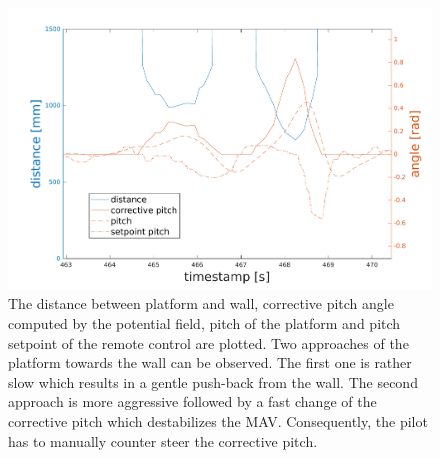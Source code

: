 \begin{figure}
	\centering
	\includegraphics[width=0.9\linewidth]{pictures/plot_pf_test.pdf}
	\caption{The distance between platform and wall, corrective pitch angle computed by the potential field, pitch of the platform and pitch setpoint of the remote control are plotted. Two approaches of the platform towards the wall can be observed. The first one is rather slow which results in a gentle push-back from the wall. The second approach is more aggressive followed by a fast change of the corrective pitch which destabilizes the MAV. Consequently, the pilot has to manually counter steer the corrective pitch.}
	\label{fig:pf test}
\end{figure}


